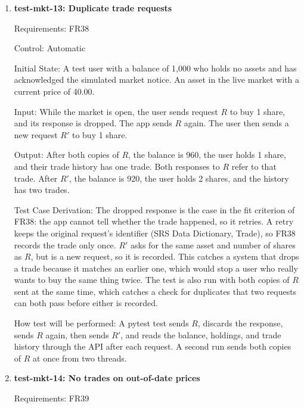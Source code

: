 \documentclass[12pt, titlepage]{article}
\begin{document}
\begin{enumerate}
How test will be performed: A pytest test replaces the backend's step for the
later of the two updates with one that raises an error, sends the trade, and
then reads the balance and holdings through the API. It restores the step
before the second purchase and replaces it again before the sale.

\item{\textbf{test-mkt-13: Duplicate trade requests}\\}

Requirements: FR38

Control: Automatic

Initial State: A test user with a balance of 1,000 who holds no assets and has
acknowledged the simulated market notice. An asset in the live market with a
current price of 40.00.

Input: While the market is open, the user sends request $R$ to buy 1 share,
and its response is dropped. The app sends $R$ again. The user then sends a
new request $R'$ to buy 1 share.

Output: After both copies of $R$, the balance is 960, the user holds 1 share,
and their trade history has one trade. Both responses to $R$ refer to that
trade. After $R'$, the balance is 920, the user holds 2 shares, and the
history has two trades.

Test Case Derivation: The dropped response is the case in the fit criterion of
FR38: the app cannot tell whether the trade happened, so it retries. A retry
keeps the original request's identifier (SRS Data Dictionary, Trade), so FR38
records the trade only once. $R'$ asks for the same asset and number
of shares as $R$, but is a new request, so it is recorded. This catches a
system that drops a trade because it matches an earlier one, which would stop
a user who really wants to buy the same thing twice. The test is also run
with both copies of $R$ sent at the same time, which catches a check for
duplicates that two requests can both pass before either is recorded.

How test will be performed: A pytest test sends $R$, discards the response,
sends $R$ again, then sends $R'$, and reads the balance, holdings, and trade
history through the API after each request. A second run sends both copies of
$R$ at once from two threads.

\item{\textbf{test-mkt-14: No trades on out-of-date prices}\\}

Requirements: FR39


\end{enumerate}
\end{document}
